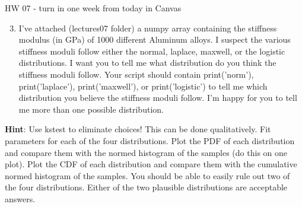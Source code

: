 \documentclass[10pt]{beamer}
\begin{document}
\begin{frame}[fragile]{HW 07 - turn in one week from today in Canvas}
\begin{enumerate}
\setcounter{enumi}{2}
\item I've attached (lectures07 folder) a numpy array containing the stiffness modulus (in GPa) of 1000 different Aluminum alloys. I suspect the various stiffness moduli follow either the normal, laplace, maxwell, or the logistic distributions. I want you to tell me what distribution do you think the stiffness moduli follow. Your script should contain print('norm'), print('laplace'), print('maxwell'), or print('logistic') to tell me which distribution you believe the stiffness moduli follow. I'm happy for you to tell me more than one possible distribution.
\end{enumerate}
\textbf{Hint}: Use kstest to eliminate choices! This can be done qualitatively. Fit parameters for each of the four distributions. Plot the PDF of each distribution and compare them with the normed histogram of the samples (do this on one plot). Plot the CDF of each distribution and compare them with the cumulative normed histogram of the samples. You should be able to easily rule out two of the four distributions. Either of the two plausible distributions are acceptable answers.
\end{frame}

%
\end{document}
